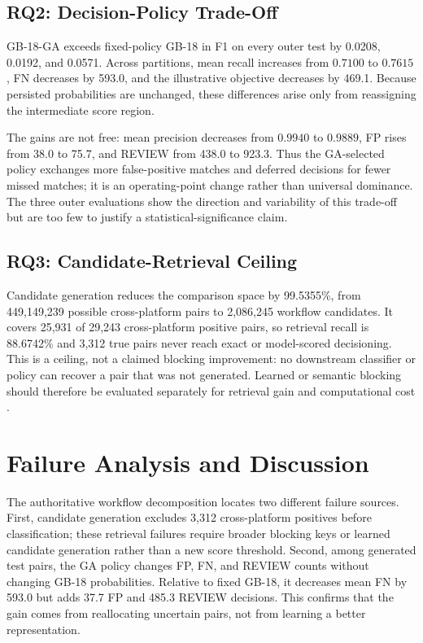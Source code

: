 \documentclass[conference]{IEEEtran}
\begin{document}
\subsection{RQ2: Decision-Policy Trade-Off}
GB-18-GA exceeds fixed-policy GB-18 in F1 on every outer test by 0.0208, 0.0192, and 0.0571. Across partitions, mean recall increases from $0.7100$ to $0.7615$, FN decreases by 593.0, and the illustrative objective decreases by 469.1. Because persisted probabilities are unchanged, these differences arise only from reassigning the intermediate score region.

The gains are not free: mean precision decreases from $0.9940$ to $0.9889$, FP rises from 38.0 to 75.7, and REVIEW from 438.0 to 923.3. Thus the GA-selected policy exchanges more false-positive matches and deferred decisions for fewer missed matches; it is an operating-point change rather than universal dominance. The three outer evaluations show the direction and variability of this trade-off but are too few to justify a statistical-significance claim.

\subsection{RQ3: Candidate-Retrieval Ceiling}
Candidate generation reduces the comparison space by 99.5355\%, from 449,149,239 possible cross-platform pairs to 2,086,245 workflow candidates. It covers 25,931 of 29,243 cross-platform positive pairs, so retrieval recall is 88.6742\% and 3,312 true pairs never reach exact or model-scored decisioning. This is a ceiling, not a claimed blocking improvement: no downstream classifier or policy can recover a pair that was not generated. Learned or semantic blocking should therefore be evaluated separately for retrieval gain and computational cost \cite{thirumuruganathan2021deepblocker}.

\section{Failure Analysis and Discussion}
The authoritative workflow decomposition locates two different failure sources. First, candidate generation excludes 3,312 cross-platform positives before classification; these retrieval failures require broader blocking keys or learned candidate generation rather than a new score threshold. Second, among generated test pairs, the GA policy changes FP, FN, and REVIEW counts without changing GB-18 probabilities. Relative to fixed GB-18, it decreases mean FN by 593.0 but adds 37.7 FP and 485.3 REVIEW decisions. This confirms that the gain comes from reallocating uncertain pairs, not from learning a better representation.
\end{document}
